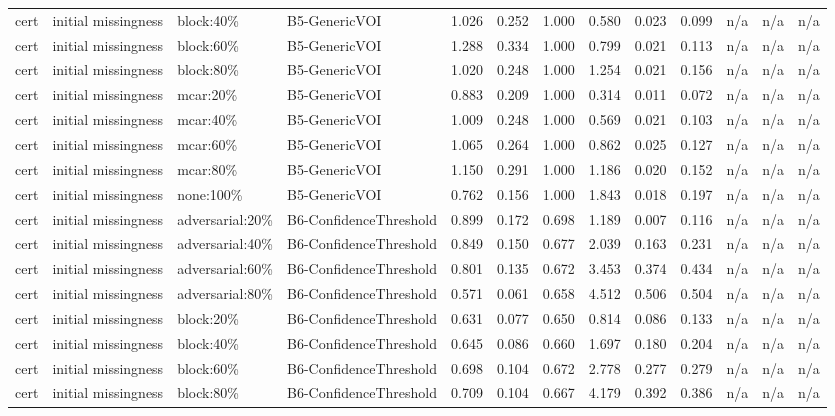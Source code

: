 \begin{table}[!ht]
{\begin{tabular}{lllllllllllll}
cert & initial missingness & block:40\% & B5-GenericVOI & 1.026 & 0.252 & 1.000 & 0.580 & 0.023 & 0.099 & n/a & n/a & n/a \\
cert & initial missingness & block:60\% & B5-GenericVOI & 1.288 & 0.334 & 1.000 & 0.799 & 0.021 & 0.113 & n/a & n/a & n/a \\
cert & initial missingness & block:80\% & B5-GenericVOI & 1.020 & 0.248 & 1.000 & 1.254 & 0.021 & 0.156 & n/a & n/a & n/a \\
cert & initial missingness & mcar:20\% & B5-GenericVOI & 0.883 & 0.209 & 1.000 & 0.314 & 0.011 & 0.072 & n/a & n/a & n/a \\
cert & initial missingness & mcar:40\% & B5-GenericVOI & 1.009 & 0.248 & 1.000 & 0.569 & 0.021 & 0.103 & n/a & n/a & n/a \\
cert & initial missingness & mcar:60\% & B5-GenericVOI & 1.065 & 0.264 & 1.000 & 0.862 & 0.025 & 0.127 & n/a & n/a & n/a \\
cert & initial missingness & mcar:80\% & B5-GenericVOI & 1.150 & 0.291 & 1.000 & 1.186 & 0.020 & 0.152 & n/a & n/a & n/a \\
cert & initial missingness & none:100\% & B5-GenericVOI & 0.762 & 0.156 & 1.000 & 1.843 & 0.018 & 0.197 & n/a & n/a & n/a \\
cert & initial missingness & adversarial:20\% & B6-ConfidenceThreshold & 0.899 & 0.172 & 0.698 & 1.189 & 0.007 & 0.116 & n/a & n/a & n/a \\
cert & initial missingness & adversarial:40\% & B6-ConfidenceThreshold & 0.849 & 0.150 & 0.677 & 2.039 & 0.163 & 0.231 & n/a & n/a & n/a \\
cert & initial missingness & adversarial:60\% & B6-ConfidenceThreshold & 0.801 & 0.135 & 0.672 & 3.453 & 0.374 & 0.434 & n/a & n/a & n/a \\
cert & initial missingness & adversarial:80\% & B6-ConfidenceThreshold & 0.571 & 0.061 & 0.658 & 4.512 & 0.506 & 0.504 & n/a & n/a & n/a \\
cert & initial missingness & block:20\% & B6-ConfidenceThreshold & 0.631 & 0.077 & 0.650 & 0.814 & 0.086 & 0.133 & n/a & n/a & n/a \\
cert & initial missingness & block:40\% & B6-ConfidenceThreshold & 0.645 & 0.086 & 0.660 & 1.697 & 0.180 & 0.204 & n/a & n/a & n/a \\
cert & initial missingness & block:60\% & B6-ConfidenceThreshold & 0.698 & 0.104 & 0.672 & 2.778 & 0.277 & 0.279 & n/a & n/a & n/a \\
cert & initial missingness & block:80\% & B6-ConfidenceThreshold & 0.709 & 0.104 & 0.667 & 4.179 & 0.392 & 0.386 & n/a & n/a & n/a \\

\end{tabular}}
\end{table}
